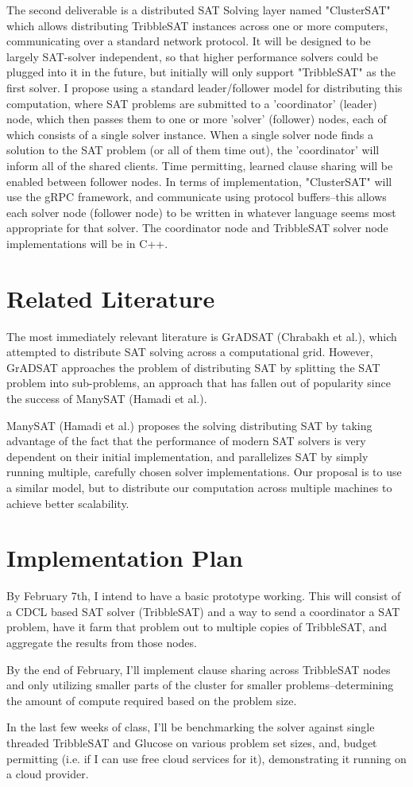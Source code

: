 \documentclass[10pt]{article}
\begin{document}
  The second deliverable is a distributed SAT Solving layer named "ClusterSAT" which allows distributing
  TribbleSAT instances across one or more computers, communicating over a standard network protocol.  It will
  be designed to be largely SAT-solver independent, so that higher performance solvers could be 
  plugged into it in the future, but initially will only support "TribbleSAT" as the first solver.
  I propose using a standard leader/follower model for distributing this computation, 
  where SAT problems are submitted to a 'coordinator' (leader) node, which then passes them to one or more 
  'solver' (follower) nodes, each of which consists of a single solver instance.  When a single solver node finds
  a solution to the SAT problem (or all of them time out), the 'coordinator' will inform all of the shared clients.
  Time permitting, learned clause sharing will be enabled between follower nodes. In terms of implementation, 
  "ClusterSAT" will use the gRPC framework, and communicate using protocol buffers--this allows each solver node 
  (follower node) to be written in whatever language seems most appropriate for that solver.  The coordinator node 
  and TribbleSAT solver node implementations will be in C++.

\section{Related Literature}
  The most immediately relevant literature is GrADSAT (Chrabakh et al.), which attempted to distribute SAT solving
  across a computational grid.  However, GrADSAT approaches the problem of distributing SAT by splitting the SAT problem
  into sub-problems, an approach that has fallen out of popularity since the success of ManySAT (Hamadi et al.).

  ManySAT (Hamadi et al.) proposes the solving distributing SAT by taking advantage of the fact that the performance of
  modern SAT solvers is very dependent on their initial implementation, and parallelizes SAT by simply running multiple,
  carefully chosen solver implementations.  Our proposal is to use a similar model, but to distribute our computation across
  multiple machines to achieve better scalability.

\section{Implementation Plan}
  By February 7th, I intend to have a basic prototype working.  This will consist of a CDCL based SAT solver (TribbleSAT) 
  and a way to send a coordinator a SAT problem, have it farm that problem out to multiple copies of TribbleSAT, and 
  aggregate the results from those nodes.

  By the end of February, I'll implement clause sharing across TribbleSAT nodes and only utilizing smaller parts of the 
  cluster for smaller problems--determining the amount of compute required based on the problem size.

  In the last few weeks of class, I'll be benchmarking the solver against single threaded TribbleSAT and Glucose on various
  problem set sizes, and, budget permitting (i.e. if I can use free cloud services for it), demonstrating it running on a
  cloud provider.
\end{document}
